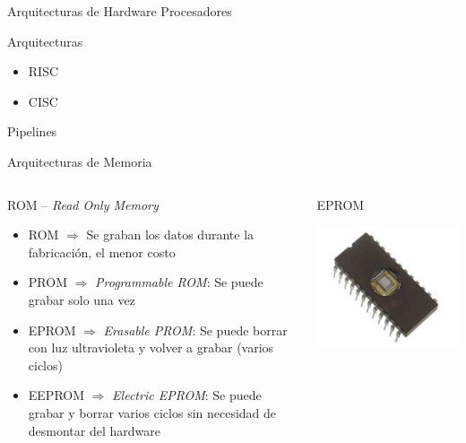 \begin{frame}{Arquitecturas de Hardware}
    Procesadores
    
    \vspace{1cm} Arquitecturas
    \begin{itemize}
        \item RISC
        \item CISC
    \end{itemize}
    
    \vspace{1cm}Pipelines
\end{frame}

\begin{frame}{Arquitecturas de Memoria}
    \begin{columns}
        \begin{block}{ROM -- \emph{Read Only Memory}}
            \begin{itemize}
                \item ROM    $\Rightarrow$ Se graban los datos durante la fabricación, el menor costo
                \item PROM   $\Rightarrow$ \emph{Programmable ROM}: Se puede grabar solo una vez
                \item EPROM  $\Rightarrow$ \emph{Erasable PROM}: Se puede borrar con luz ultravioleta y volver a grabar (varios ciclos)
                \item EEPROM $\Rightarrow$ \emph{Electric EPROM}: Se puede grabar y borrar varios ciclos sin necesidad de desmontar del hardware
            \end{itemize}
        \end{block}
        \begin{block}{EPROM}
            \begin{center}
                \includegraphics[width=.9\linewidth]{../imagenes/eprom}
            \end{center}
        \end{block}
    \end{columns}
\end{frame}

